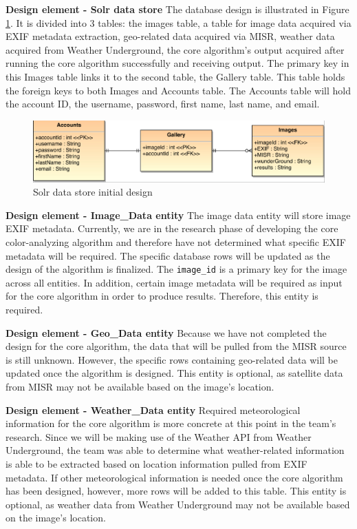 \documentclass[onecolumn, draftclsnofoot,10pt, compsoc]{IEEEtran}
\begin{document}
\begin{flushleft}
\medskip

\textbf{Design element - Solr data store} The database design is illustrated in Figure \ref{fig:mysql}. It is divided into 3 tables: the images table, a table for image data acquired via EXIF metadata extraction, geo-related data acquired via MISR, weather data acquired from Weather Underground, the core algorithm’s output acquired after running the core algorithm successfully and receiving output. The primary key in this Images table links it to the second table, the Gallery table. This table holds the foreign keys to both Images and Accounts table. The Accounts table will hold the account ID, the username, password, first name, last name, and email.


\begin{figure}[H]
\centering
  \includegraphics[width=\textwidth]{mysql.eps}
  \caption{Solr data store initial design}
  \label{fig:mysql}
\end{figure}


\textbf{Design element - Image\_Data entity} The image data entity will store image EXIF metadata. Currently, we are in the research phase of developing the core color-analyzing algorithm and therefore have not determined what specific EXIF metadata will be required. The specific database rows will be updated as the design of the algorithm is finalized. The \texttt{image\_id} is a primary key for the image across all entities. In addition, certain image metadata will be required as input for the core algorithm in order to produce results. Therefore, this entity is required.

\medskip

\textbf{Design element - Geo\_Data entity} Because we have not completed the design for the core algorithm, the data that will be pulled from the MISR source is still unknown. However, the specific rows containing geo-related data will be updated once the algorithm is designed. This entity is optional, as satellite data from MISR may not be available based on the image’s location. 

\medskip

\textbf{Design element - Weather\_Data entity} Required meteorological information for the core algorithm is more concrete at this point in the team’s research. Since we will be making use of the Weather API from Weather Underground, the team was able to determine what weather-related information is able to be extracted based on location information pulled from EXIF metadata. If other meteorological information is needed once the core algorithm has been designed, however, more rows will be added to this table. This entity is optional, as weather data from Weather Underground may not be available based on the image’s location. 


\end{flushleft}
\end{document}
